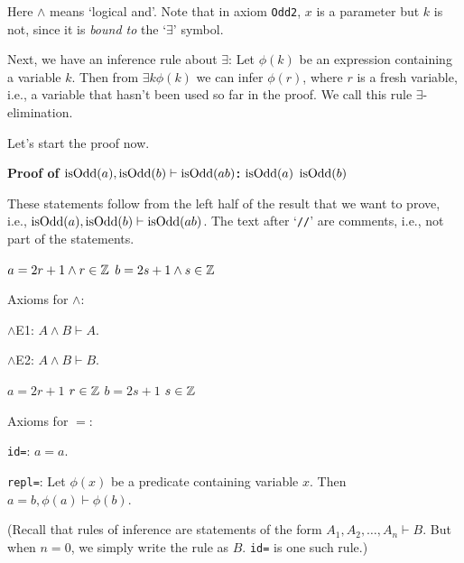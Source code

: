 Here $\land$ means `logical and'.
Note that in axiom \texttt{Odd2}, $x$ is a parameter but $k$ is not,
since it is \emph{bound to} the `$\exists$' symbol.

Next, we have an inference rule about $\exists$:
Let $\phi(k)$ be an expression containing a variable $k$.
Then from $\exists k \phi(k)$ we can infer $\phi(r)$,
where $r$ is a fresh variable, i.e., a variable that hasn't been used so far in the proof.
We call this rule $\exists$-elimination.

Let's start the proof now.

\begin{formalproof}
\Statex \textbf{Proof of $\operatorname{isOdd}(a), \operatorname{isOdd}(b) \vdash \operatorname{isOdd}(ab)$:}
\State \label{p1:given1}$\operatorname{isOdd}(a)$ 
\State \label{p1:given2}$\operatorname{isOdd}(b)$ 
\end{formalproof}

These statements follow from the left half of the result that we want to prove,
i.e., $\operatorname{isOdd}(a), \operatorname{isOdd}(b) \vdash \operatorname{isOdd}(ab)$.
The text after `\texttt{//}' are comments, i.e., not part of the statements.

\begin{formalproof}
\State \label{p1:oddEla}$a = 2r + 1 \land r \in \mathbb{Z}$
\State \label{p1:oddElb}$b = 2s + 1 \land s \in \mathbb{Z}$
\end{formalproof}

Axioms for $\land$:
\begin{tightemize}
\item $\land$E1: $A \land B \vdash A$.
\item $\land$E2: $A \land B \vdash B$.
\end{tightemize}

\begin{formalproof}
\State \label{p1:aeq2rp1}$a = 2r + 1$
\State \label{p1:rinZ}$r \in \mathbb{Z}$
\State \label{p1:beq2sp1}$b = 2s + 1$
\State \label{p1:sinZ}$s \in \mathbb{Z}$
\end{formalproof}

Axioms for $=$:
\begin{tightemize}
\item \texttt{id=}: $a = a$.
\item \texttt{repl=}: Let $\phi(x)$ be a predicate containing variable $x$.
Then $a = b, \phi(a) \vdash \phi(b)$.
\end{tightemize}
(Recall that rules of inference are statements of the form $A_1, A_2, \ldots, A_n \vdash B$.
But when $n = 0$, we simply write the rule as $B$. \texttt{id=} is one such rule.)

